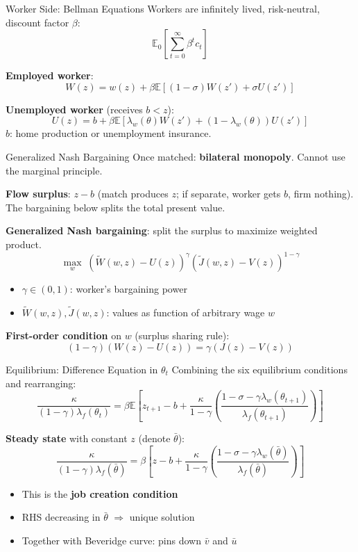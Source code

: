 \documentclass[blue]{beamer}
\newcommand{\E}{\mathbb{E}}
\begin{document}
\begin{frame}{Worker Side: Bellman Equations}
	Workers are infinitely lived, risk-neutral, discount factor $\beta$:
	\[
	\E_0 \left[ \sum_{t=0}^\infty \beta^t c_t \right]
	\]
	
	\textbf{Employed worker}:
	\[
	W(z) = w(z) + \beta \E[(1 - \sigma) W(z') + \sigma U(z')]
	\]
	
	\textbf{Unemployed worker} (receives $b < z$):
	\[
	U(z) = b + \beta \E[\lambda_w(\theta) W(z') + (1 - \lambda_w(\theta)) U(z')]
	\]
	$b$: home production or unemployment insurance.
\end{frame}

\begin{frame}{Generalized Nash Bargaining}
	Once matched: \textbf{bilateral monopoly}. Cannot use the marginal principle.
	
	\textbf{Flow surplus}: $z - b$ (match produces $z$; if separate, worker gets $b$, firm nothing). The bargaining below splits the total present value.
	
	\textbf{Generalized Nash bargaining}: split the surplus to maximize weighted product.
	\[
	\max_w \; (\tilde{W}(w, z) - U(z))^\gamma (\tilde{J}(w, z) - V(z))^{1-\gamma}
	\]
	
	\begin{itemize}
		\item $\gamma \in (0, 1)$: worker's bargaining power
		\item $\tilde{W}(w, z), \tilde{J}(w, z)$: values as function of arbitrary wage $w$
	\end{itemize}
	
	\bigskip
	\textbf{First-order condition} on $w$ (surplus sharing rule):
	\[
{(1 - \gamma)(W(z) - U(z)) = \gamma(J(z) - V(z))}
	\]
\end{frame}

\begin{frame}{Equilibrium: Difference Equation in $\theta_t$}
	Combining the six equilibrium conditions and rearranging:
	\[
	\frac{\kappa}{(1 - \gamma) \lambda_f(\theta_t)} = \beta \E\!\left[z_{t+1} - b + \frac{\kappa}{1-\gamma}\! \left(\frac{1 - \sigma - \gamma \lambda_w(\theta_{t+1})}{\lambda_f(\theta_{t+1})}\right)\right]
	\]
	
	\bigskip
	\textbf{Steady state} with constant $z$ (denote $\bar\theta$):
	\[
	\frac{\kappa}{(1 - \gamma) \lambda_f(\bar\theta)} = \beta \left[z - b + \frac{\kappa}{1-\gamma}\!\left(\frac{1 - \sigma - \gamma \lambda_w(\bar\theta)}{\lambda_f(\bar\theta)}\right)\right]
	\]
	
	\bigskip
	\begin{itemize}
		\item This is the \textbf{job creation condition}
		\item RHS decreasing in $\bar\theta$ $\Rightarrow$ unique solution
		\item Together with Beveridge curve: pins down $\bar{v}$ and $\bar{u}$
	\end{itemize}
\end{frame}
\end{document}
